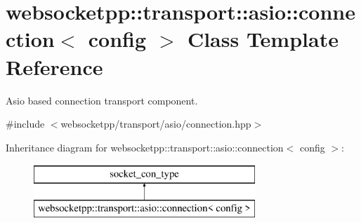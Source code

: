 \hypertarget{classwebsocketpp_1_1transport_1_1asio_1_1connection}{}\section{websocketpp\+:\+:transport\+:\+:asio\+:\+:connection$<$ config $>$ Class Template Reference}
\label{classwebsocketpp_1_1transport_1_1asio_1_1connection}


Asio based connection transport component.  




{\ttfamily \#include $<$websocketpp/transport/asio/connection.\+hpp$>$}

Inheritance diagram for websocketpp\+:\+:transport\+:\+:asio\+:\+:connection$<$ config $>$\+:\begin{figure}[H]
\begin{center}
\leavevmode
\includegraphics[height=2.000000cm]{classwebsocketpp_1_1transport_1_1asio_1_1connection}
\end{center}
\end{figure}
